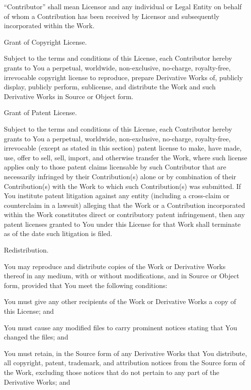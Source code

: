 \documentclass{article}
\begin{document}
  ``Contributor'' shall mean Licensor and any individual or Legal
  Entity on behalf of whom a Contribution has been received by
  Licensor and subsequently incorporated within the Work.

  Grant of Copyright License. 

  Subject to the terms and conditions of
  this License, each Contributor hereby grants to You a perpetual,
  worldwide, non-exclusive, no-charge, royalty-free, irrevocable
  copyright license to reproduce, prepare Derivative Works of,
  publicly display, publicly perform, sublicense, and distribute the
  Work and such Derivative Works in Source or Object form.

  Grant of Patent License. 

  Subject to the terms and conditions of
  this License, each Contributor hereby grants to You a perpetual,
  worldwide, non-exclusive, no-charge, royalty-free, irrevocable
  (except as stated in this section) patent license to make, have
  made, use, offer to sell, sell, import, and otherwise transfer the
  Work, where such license applies only to those patent claims
  licensable by such Contributor that are necessarily infringed by
  their Contribution(s) alone or by combination of their
  Contribution(s) with the Work to which such Contribution(s) was
  submitted. If You institute patent litigation against any entity
  (including a cross-claim or counterclaim in a lawsuit) alleging
  that the Work or a Contribution incorporated within the Work
  constitutes direct or contributory patent infringement, then any
  patent licenses granted to You under this License for that Work
  shall terminate as of the date such litigation is filed.

  Redistribution. 

  You may reproduce and distribute copies of the Work
  or Derivative Works thereof in any medium, with or without
  modifications, and in Source or Object form, provided that You meet
  the following conditions:

    You must give any other recipients of the Work or Derivative Works
    a copy of this License; and

    You must cause any modified files to carry prominent notices
    stating that You changed the files; and

    You must retain, in the Source form of any Derivative Works that
    You distribute, all copyright, patent, trademark, and attribution
    notices from the Source form of the Work, excluding those notices
    that do not pertain to any part of the Derivative Works; and
\end{document}
